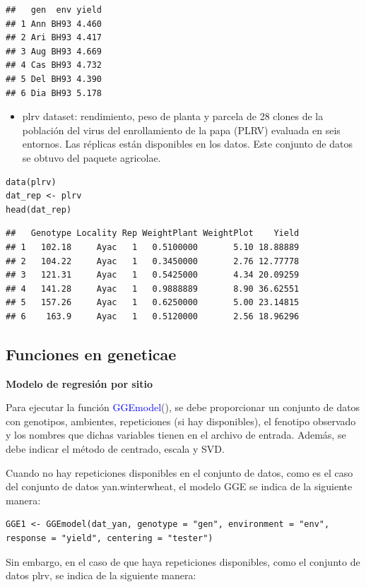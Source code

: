 \begin{verbatim}
##   gen  env yield
## 1 Ann BH93 4.460
## 2 Ari BH93 4.417
## 3 Aug BH93 4.669
## 4 Cas BH93 4.732
## 5 Del BH93 4.390
## 6 Dia BH93 5.178
\end{verbatim}
\begin{itemize}
\item plrv dataset: rendimiento, peso de planta y parcela de 28 clones de la población del virus del enrollamiento de la papa (PLRV) evaluada en seis entornos. Las réplicas están disponibles en los datos. Este conjunto de datos se obtuvo del paquete agricolae.
\end{itemize}
\begin{lstlisting}
data(plrv)
dat_rep <- plrv
head(dat_rep)
\end{lstlisting}


\begin{verbatim}
##   Genotype Locality Rep WeightPlant WeightPlot    Yield
## 1   102.18     Ayac   1   0.5100000       5.10 18.88889
## 2   104.22     Ayac   1   0.3450000       2.76 12.77778
## 3   121.31     Ayac   1   0.5425000       4.34 20.09259
## 4   141.28     Ayac   1   0.9888889       8.90 36.62551
## 5   157.26     Ayac   1   0.6250000       5.00 23.14815
## 6    163.9     Ayac   1   0.5120000       2.56 18.96296
\end{verbatim}

 
\subsection{Funciones en geneticae}

\textbf{Modelo de regresión por sitio}

Para ejecutar la función \textcolor{blue}{GGEmodel}(), se debe proporcionar un conjunto de datos con genotipos, ambientes, repeticiones (si hay disponibles), el fenotipo observado y los nombres que dichas variables tienen en el archivo de entrada. Además, se debe indicar el método de centrado, escala y SVD.

Cuando no hay repeticiones disponibles en el conjunto de datos, como es el caso del conjunto de datos yan.winterwheat, el modelo GGE se indica de la siguiente manera:


\begin{lstlisting}
GGE1 <- GGEmodel(dat_yan, genotype = "gen", environment = "env", response = "yield", centering = "tester")
\end{lstlisting}


Sin embargo, en el caso de que haya repeticiones disponibles, como el conjunto de datos plrv, se indica de la siguiente manera:


